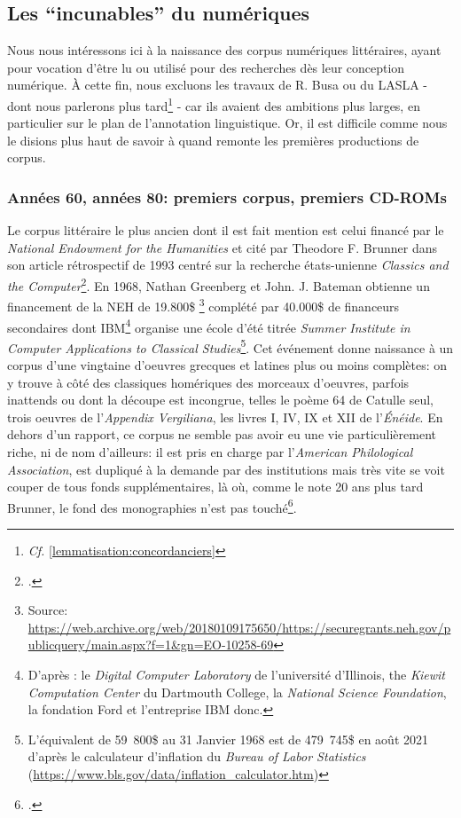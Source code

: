 \subsection{Les \enquote{incunables} du numériques}


Nous nous intéressons ici à la naissance des corpus numériques littéraires, ayant pour vocation d'être lu ou utilisé pour des recherches dès leur conception numérique. À cette fin, nous excluons les travaux de R. Busa ou du LASLA - dont nous parlerons plus tard\footnote{\textit{Cf.} \ref{lemmatisation:concordanciers}} - car ils avaient des ambitions plus larges, en particulier sur le plan de l'annotation linguistique. Or, il est difficile comme nous le disions plus haut de savoir à quand remonte les premières productions de corpus.


\subsubsection{Années 60, années 80: premiers corpus, premiers CD-ROMs}

Le corpus littéraire le plus ancien dont il est fait mention est celui financé par le \textit{National Endowment for the Humanities} et cité par Theodore F. Brunner dans son article rétrospectif de 1993 centré sur la recherche états-unienne \textit{Classics and the Computer}\footcite{brunner_classics_1993}. En 1968, Nathan Greenberg et John. J. Bateman obtienne un financement de la NEH de 19.800\$ \footnote{Source: \url{https://web.archive.org/web/20180109175650/https://securegrants.neh.gov/publicquery/main.aspx?f=1&gn=EO-10258-69}} complété par 40.000\$ de financeurs secondaires dont IBM\footnote{D'après \cite{brunner_classics_1993}: le \textit{Digital Computer Laboratory} de l'université d'Illinois, the \textit{Kiewit Computation Center} du Dartmouth College, la \textit{National Science Foundation}, la fondation Ford et l'entreprise IBM donc.} organise une école d'été titrée \textit{Summer Institute in Computer Applications to Classical Studies}\footnote{L'équivalent de 59~800\$ au 31 Janvier 1968 est de 479~745\$ en août 2021 d'après le calculateur d'inflation du \textit{Bureau of Labor Statistics} (\url{https://www.bls.gov/data/inflation_calculator.htm})}. Cet événement donne naissance à un corpus d'une vingtaine d'oeuvres grecques et latines plus ou moins complètes: on y trouve à côté des classiques homériques des morceaux d'oeuvres, parfois inattends ou dont la découpe est incongrue, telles le poème 64 de Catulle seul, trois oeuvres de l'\textit{Appendix Vergiliana}, les livres I, IV, IX et XII de l'\textit{Énéide}. En dehors d'un rapport, ce corpus ne semble pas avoir eu une vie particulièrement riche, ni de nom d'ailleurs: il est pris en charge par l'\textit{American Philological Association}, est dupliqué à la demande par des institutions mais très vite se voit couper de tous fonds supplémentaires, là où, comme le note 20 ans plus tard Brunner, le fond des monographies n'est pas touché\footcite{brunner_classics_1993}.

